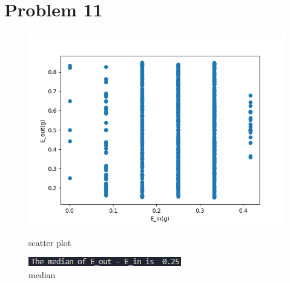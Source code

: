 \documentclass[12pt,a4paper]{article}
\begin{document}
\section*{Problem 11}    

\begin{figure}[hbp]
    \centering
    \begin{minipage}{0.48\linewidth}
        \centering
        \includegraphics[width = \linewidth]{Hw2P11.png}
        \caption{scatter plot}
    \end{minipage}\hfil
    \begin{minipage}{0.48\linewidth}
        \centering
        \includegraphics[width = \linewidth]{Hw2P11 median.png}
        \caption{median}
    \end{minipage}\hfil
    \centering

\end{figure}
\end{document}

